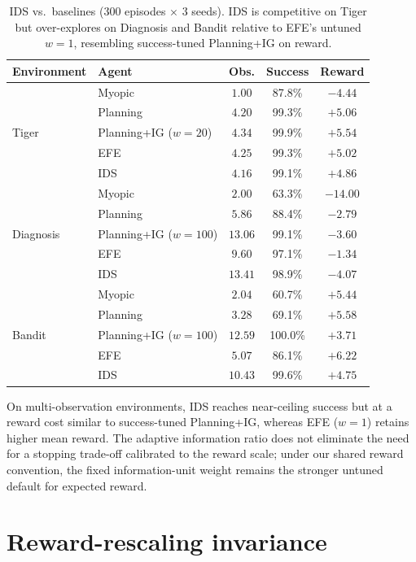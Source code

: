 \documentclass[runningheads]{llncs}
\begin{document}
\begin{table}[h]
\centering
\caption{IDS vs.\ baselines (300 episodes $\times$ 3 seeds). IDS is competitive on Tiger but over-explores on Diagnosis and Bandit relative to EFE's untuned $w{=}1$, resembling success-tuned Planning+IG on reward.}
\label{tab:ids}
\begin{small}
\begin{tabular}{llccc}
\toprule
Environment & Agent & Obs. & Success & Reward \\
\midrule
\multirow{5}{*}{Tiger}
& Myopic & $1.00$ & 87.8\% & $-4.44$ \\
& Planning & $4.20$ & 99.3\% & $+5.06$ \\
& Planning+IG ($w{=}20$) & $4.34$ & 99.9\% & $+5.54$ \\
& EFE & $4.25$ & 99.3\% & $+5.02$ \\
& IDS & $4.16$ & 99.1\% & $+4.86$ \\
\midrule
\multirow{5}{*}{Diagnosis}
& Myopic & $2.00$ & 63.3\% & $-14.00$ \\
& Planning & $5.86$ & 88.4\% & $-2.79$ \\
& Planning+IG ($w{=}100$) & $13.06$ & 99.1\% & $-3.60$ \\
& EFE & $9.60$ & 97.1\% & $-1.34$ \\
& IDS & $13.41$ & 98.9\% & $-4.07$ \\
\midrule
\multirow{5}{*}{Bandit}
& Myopic & $2.04$ & 60.7\% & $+5.44$ \\
& Planning & $3.28$ & 69.1\% & $+5.58$ \\
& Planning+IG ($w{=}100$) & $12.59$ & 100.0\% & $+3.71$ \\
& EFE & $5.07$ & 86.1\% & $+6.22$ \\
& IDS & $10.43$ & 99.6\% & $+4.75$ \\
\bottomrule
\end{tabular}
\end{small}
\end{table}

On multi-observation environments, IDS reaches near-ceiling success but at a reward cost similar to success-tuned Planning+IG, whereas EFE ($w{=}1$) retains higher mean reward. The adaptive information ratio does not eliminate the need for a stopping trade-off calibrated to the reward scale; under our shared reward convention, the fixed information-unit weight remains the stronger untuned default for expected reward.

\section{Reward-rescaling invariance}
\label{app:reward_scaling}
\end{document}

